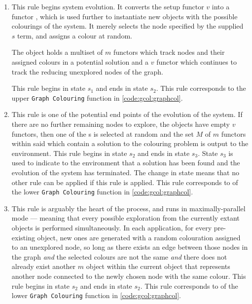 \begin{enumerate}
\item This rule begins system evolution.  It converts the setup \gls{functor} \(v\) into a \gls{functor} \bo{}, which is used further to instantiate new objects with the possible colourings of the system.  It merely selects the node specified by the supplied \(s\) term, and assigns a colour at random.

The \bo{} object holds a multiset of \(m\) \glspl{functor} which track nodes and their assigned colours in a potential solution and a \(v\) \gls{functor} which continues to track the reducing unexplored nodes of the graph.

This rule begins in state \(s_1\) and ends in state \(s_2\).  This rule corresponds to the upper \texttt{Graph Colouring} function in \cref{code:gcol:graphcol}.

\item This rule is one of the potential end points of the evolution of the system.  If there are no further remaining nodes to explore, \ie{} the \bo{} objects have empty \(v\) \glspl{functor}, then one of the \bo{}s is selected at random and the set \(M\) of \(m\) \glspl{functor} within said \bo{} which contain a solution to the colouring problem is output to the environment.  This rule begins in state \(s_2\) and ends in state \(s_3\).  State \(s_3\) is used to indicate to the environment that a solution has been found and the evolution of the system has terminated.  The change in state means that no other rule can be applied if this rule is applied.  This rule corresponds to  of the lower \texttt{Graph Colouring} function in \cref{code:gcol:graphcol}.

\item This rule is arguably the heart of the process, and runs in maximally-parallel mode --- meaning that every possible exploration from the currently extant \bo{} objects is performed simultaneously.  In each application, for every pre-existing \bo{} object, new ones are generated with a random colouration assigned to an unexplored node, so long as there exists an edge between those nodes in the graph \emph{and} the selected colours are not the same \emph{and} there does not already exist another \(m\) object within the current \bo{} object that represents another node connected to the newly chosen node with the same colour.  This rule begins in state \(s_2\) and ends in state \(s_2\).  This rule corresponds to  of the lower \texttt{Graph Colouring} function in \cref{code:gcol:graphcol}.


\end{enumerate}
